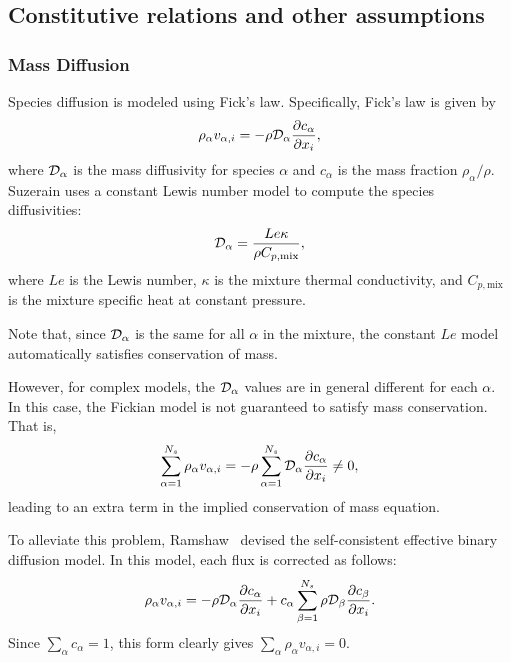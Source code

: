\subsection{Constitutive relations and other assumptions}
\label{sec:constitutive}

\subsubsection{Mass Diffusion}
Species diffusion is modeled using Fick's law.
Specifically, Fick's law is given by
%
\begin{equation*}
\rho_{\alpha} v_{\alpha, i} = - \rho \mathcal{D}_{\alpha} \frac{\partial c_{\alpha}}{\partial x_i},
\end{equation*}
% 
where $\mathcal{D}_{\alpha}$ is the mass diffusivity for species $\alpha$
and $c_{\alpha}$ is the mass fraction $\rho_{\alpha} / \rho$.
Suzerain uses a constant Lewis number model to compute the species
diffusivities:
%
\begin{equation*}
\mathcal{D}_{\alpha} = \frac{Le \kappa}{\rho C_{p,\mathrm{mix}}},
\end{equation*}
%
where $Le$ is the Lewis number, $\kappa$ is the mixture thermal
conductivity, and $C_{p,\mathrm{mix}}$ is the mixture specific heat at
constant pressure.  

Note that, since $\mathcal{D}_{\alpha}$ is the same for all $\alpha$ in
the mixture, the constant $Le$ model automatically satisfies
conservation of mass.

However, for complex models, the $\mathcal{D}_{\alpha}$ values are in
general different for each $\alpha$.  In this case, the Fickian model
is not guaranteed to satisfy mass conservation.  That is,
%
\begin{equation*}
\sum_{\alpha = 1}^{N_s} \rho_{\alpha} v_{\alpha, i} = - \rho \sum_{\alpha = 1}^{N_s} \mathcal{D}_{\alpha} \frac{\partial c_{\alpha}}{\partial x_i} \neq 0,
\end{equation*}
% 
leading to an extra term in the implied conservation of mass
equation.

To alleviate this problem, Ramshaw~\cite{?} devised the self-consistent
effective binary diffusion model.  In this model, each flux is
corrected as follows:
%
\begin{equation*}
\rho_{\alpha} v_{\alpha, i} = - \rho \mathcal{D}_{\alpha} \frac{\partial c_{\alpha}}{\partial x_i} + c_{\alpha} \sum_{\beta = 1}^{N_s} \rho \mathcal{D}_{\beta} \frac{\partial c_{\beta}}{\partial x_i}.
\end{equation*}
% 
Since $\sum_{\alpha} c_{\alpha} = 1$, this form clearly gives
$\sum_{\alpha} \rho_{\alpha} v_{\alpha,i} = 0$.

